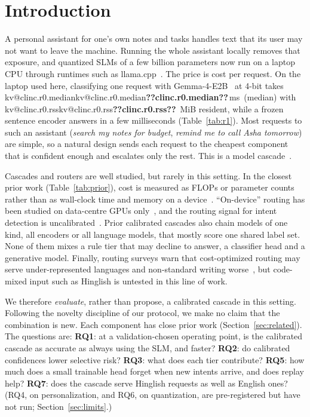 \documentclass[11pt,a4paper]{article}
\makeatletter
\DeclareRobustCommand{\kv}[1]{\ifcsname kv@#1\endcsname\csname kv@#1\endcsname\else\textbf{??#1??}\fi}
\newcommand{\ms}{\,ms}
\makeatother
\begin{document}
\section{Introduction}\label{sec:intro}

A personal assistant for one's own notes and tasks handles text that its user may not want to leave the machine.
Running the whole assistant locally removes that exposure, and quantized SLMs of a few billion parameters now run on a
laptop CPU through runtimes such as llama.cpp~\citep{llamacpp}. The price is cost per request. On the laptop used here,
classifying one request with Gemma-4-E2B~\citep{gemma4} at 4-bit takes \kv{clinc.r0.median}\ms\ (median) with
\kv{clinc.r0.rss}~MiB resident, while a frozen sentence encoder answers in a few milliseconds
(Table~\ref{tab:r1}). Most requests to such an assistant (\emph{search my notes for budget}, \emph{remind me to call Asha
tomorrow}) are simple, so a natural design sends each request to the cheapest component that is confident enough and
escalates only the rest. This is a model cascade~\citep{varshney2022modelcascading,chen2023frugalgpt}.

Cascades and routers are well studied, but rarely in this setting. In the closest prior work
(Table~\ref{tab:prior}), cost is measured as FLOPs or parameter counts rather than as wall-clock time and memory on a
device~\citep{li2021cascadebert,lu2024c3,zhang2026cauc}. ``On-device'' routing has been studied on data-centre
GPUs only~\citep{chuang2025ondevice}, and the routing signal for intent detection is uncalibrated~\citep{arora2024intentllm}.
Prior calibrated cascades also chain models of one kind, all encoders or all language models, that mostly score one
shared label set. None of them mixes a
rule tier that may decline to answer, a classifier head and a generative model. Finally, routing surveys warn that
cost-optimized routing may serve under-represented languages and non-standard writing worse~\citep{moslem2026routingsurvey},
but code-mixed input such as Hinglish is untested in this line of work.

We therefore \emph{evaluate}, rather than propose, a calibrated cascade in this setting. Following the novelty
discipline of our protocol, we make no claim that the combination is new. Each component has close prior work
(Section~\ref{sec:related}). The questions are:
\textbf{RQ1}: at a validation-chosen operating point, is the calibrated cascade as accurate as always using the SLM, and
faster? \textbf{RQ2}: do calibrated confidences lower selective risk? \textbf{RQ3}: what does each tier contribute?
\textbf{RQ5}: how much does a small trainable head forget when new intents arrive, and does replay help?
\textbf{RQ7}: does the cascade serve Hinglish requests as well as English ones?
(RQ4, on personalization, and RQ6, on quantization, are pre-registered but have not run; Section~\ref{sec:limits}.)
\end{document}
